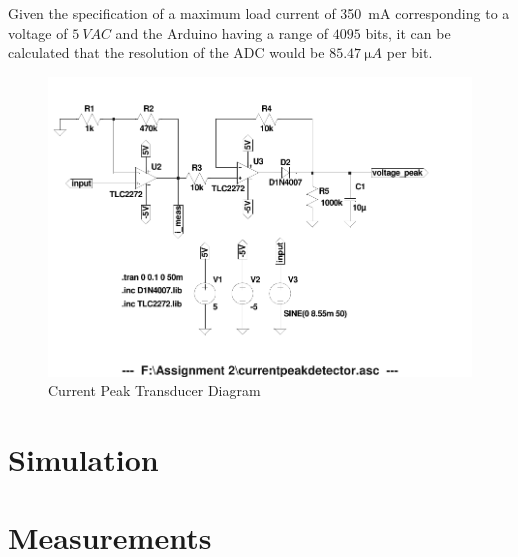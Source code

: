 Given the specification of a maximum load current of \SI{350}{\milli A} corresponding to a voltage of $\SI{5}{VAC}$ and the Arduino having a range of $4095$ bits, it can be calculated that the resolution of the ADC would be $\SI{85.47}{\micro A}$ per bit.
\begin{figure}[h!]
    \centering
    \includegraphics[width = 0.65\linewidth]{Figures/currentpeakdetector.pdf}
        \caption{Current Peak Transducer Diagram}
    \label{fig:currentpeakdetector.pdf}
\end{figure}

\section{Simulation} \label{sec:simulation_switchmode}

\section{Measurements} \label{sec:measurements_switchmode}








